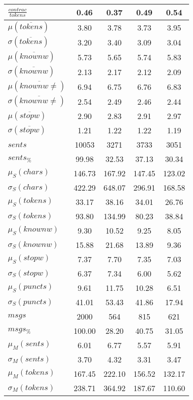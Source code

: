 \begin{table}[h!]
\begin{center}
\begin{tabular}{| l || c | c | c | c |}
$\frac{contrac}{tokens}$ & 0.46  & 0.37  & 0.49  & 0.54 \\\hline\hline
$\mu(\overline{tokens})$ & 3.80  & 3.78  & 3.73  & 3.95 \\
$\sigma(\overline{tokens})$ & 3.20  & 3.40  & 3.09  & 3.04 \\\hline
$\mu(\overline{knownw})$ & 5.73  & 5.65  & 5.74  & 5.83 \\
$\sigma(\overline{knownw})$ & 2.13  & 2.17  & 2.12  & 2.09 \\\hline
$\mu(\overline{knownw \neq})$ & 6.94  & 6.75  & 6.76  & 6.83 \\
$\sigma(\overline{knownw \neq})$ & 2.54  & 2.49  & 2.46  & 2.44 \\\hline
$\mu(\overline{stopw})$ & 2.90  & 2.83  & 2.91  & 2.97 \\
$\sigma(\overline{stopw})$ & 1.21  & 1.22  & 1.22  & 1.19 \\\hline\hline
$sents$ & 10053  & 3271  & 3733  & 3051 \\
$sents_{\%}$ & 99.98  & 32.53  & 37.13  & 30.34 \\\hline
$\mu_S(chars)$ & 146.73  & 167.92  & 147.45  & 123.02 \\
$\sigma_S(chars)$ & 422.29  & 648.07  & 296.91  & 168.58 \\\hline
$\mu_S(tokens)$ & 33.17  & 38.16  & 34.01  & 26.76 \\
$\sigma_S(tokens)$ & 93.80  & 134.99  & 80.23  & 38.84 \\\hline
$\mu_S(knownw)$ & 9.30  & 10.52  & 9.25  & 8.05 \\
$\sigma_S(knownw)$ & 15.88  & 21.68  & 13.89  & 9.36 \\\hline
$\mu_S(stopw)$ & 7.37  & 7.70  & 7.35  & 7.03 \\
$\sigma_S(stopw)$ & 6.37  & 7.34  & 6.00  & 5.62 \\\hline
$\mu_S(puncts)$ & 9.61  & 11.75  & 10.28  & 6.51 \\
$\sigma_S(puncts)$ & 41.01  & 53.43  & 41.86  & 17.94 \\\hline\hline
$msgs$ & 2000  & 564  & 815  & 621 \\
$msgs_{\%}$ & 100.00  & 28.20  & 40.75  & 31.05 \\\hline
$\mu_M(sents)$ & 6.01  & 6.77  & 5.57  & 5.91 \\
$\sigma_M(sents)$ & 3.70  & 4.32  & 3.31  & 3.47 \\\hline
$\mu_M(tokens)$ & 167.45  & 222.10  & 156.52  & 132.17 \\
$\sigma_M(tokens)$ & 238.71  & 364.92  & 187.67  & 110.60 \\\hline

\end{tabular}
\end{center}
\end{table}
